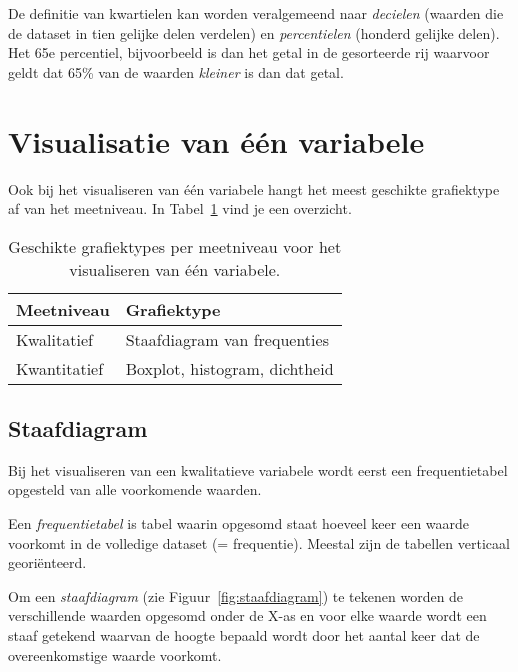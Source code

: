 De definitie van kwartielen kan worden veralgemeend naar \emph{decielen} (waarden die de dataset in tien gelijke delen verdelen) en \emph{percentielen} (honderd gelijke delen). Het 65e percentiel, bijvoorbeeld is dan het getal in de gesorteerde rij waarvoor geldt dat 65\% van de waarden \emph{kleiner} is dan dat getal.

\section{Visualisatie van één variabele}

Ook bij het visualiseren van één variabele hangt het meest geschikte grafiektype af van het meetniveau. In Tabel~\ref{tab:grafiektypes-1-variabele} vind je een overzicht.

\begin{table}
  \centering
  \begin{tabular}{ll}
  	\toprule
  	\textbf{Meetniveau} & \textbf{Grafiektype}          \\
  	\midrule
  	Kwalitatief         & Staafdiagram van frequenties  \\
  	\midrule
  	Kwantitatief        & Boxplot, histogram, dichtheid \\
  	\bottomrule
  \end{tabular}
  \caption{Geschikte grafiektypes per meetniveau voor het visualiseren van één variabele.}
  \label{tab:grafiektypes-1-variabele}
\end{table}

\subsection{Staafdiagram}

Bij het visualiseren van een kwalitatieve variabele wordt eerst een frequentietabel opgesteld van alle voorkomende waarden.

\begin{definition}[Frequentietabel]
  Een \emph{frequentietabel} is tabel waarin opgesomd staat hoeveel keer een waarde voorkomt in de volledige dataset (= frequentie). Meestal zijn de tabellen verticaal georiënteerd.
\end{definition}

Om een \emph{staafdiagram} (zie Figuur~\ref{fig:staafdiagram}) te tekenen worden de verschillende waarden opgesomd onder de X-as en voor elke waarde wordt een staaf getekend waarvan de hoogte bepaald wordt door het aantal keer dat de overeenkomstige waarde voorkomt.


